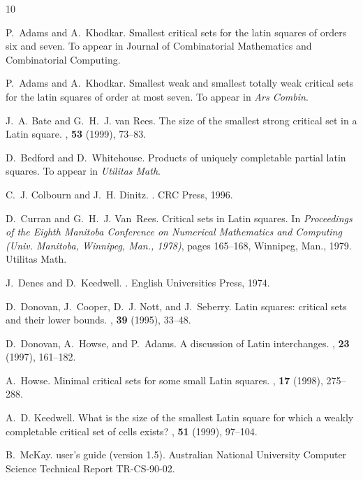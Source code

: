 \begin{thebibliography}{10}

P.~Adams and A.~Khodkar.
\newblock Smallest critical sets for the latin squares of orders six and seven.
\newblock To appear in Journal of Combinatorial Mathematics and Combinatorial
  Computing.

P.~Adams and A.~Khodkar.
\newblock Smallest weak and smallest totally weak critical sets for the latin
  squares of order at most seven.
\newblock To appear in {\it Ars Combin}.

J.~A. Bate and G.~H.~J. van Rees.
\newblock The size of the smallest strong critical set in a {L}atin square.
, {\bf 53} (1999), 73--83.

D.~Bedford and D.~Whitehouse.
\newblock Products of uniquely completable partial latin squares.
\newblock To appear in {\it Utilitas Math}.

C.~J. Colbourn and J.~H. Dinitz.
.
\newblock CRC Press, 1996.

D.~Curran and G.~H.~J. Van~Rees.
\newblock Critical sets in {L}atin squares.
\newblock In {\em Proceedings of the Eighth Manitoba Conference on Numerical
  Mathematics and Computing (Univ. Manitoba, Winnipeg, Man., 1978)}, pages
  165--168, Winnipeg, Man., 1979. Utilitas Math.

J.~Denes and D.~Keedwell.
.
\newblock English Universities Press, 1974.

D.~Donovan, J.~Cooper, D.~J. Nott, and J.~Seberry.
\newblock Latin squares: critical sets and their lower bounds.
, {\bf 39} (1995), 33--48.

D.~Donovan, A.~Howse, and P.~Adams.
\newblock A discussion of {L}atin interchanges.
, {\bf 23} (1997), 161--182.

A.~Howse.
\newblock Minimal critical sets for some small {L}atin squares.
, {\bf 17} (1998), 275--288.

A.~D. Keedwell.
\newblock What is the size of the smallest {L}atin square for which a weakly
  completable critical set of cells exists?
, {\bf 51} (1999), 97--104.

B.~McKay.
 user's guide (version 1.5).
\newblock Australian National University Computer Science Technical Report
  TR-CS-90-02.

\end{thebibliography}


